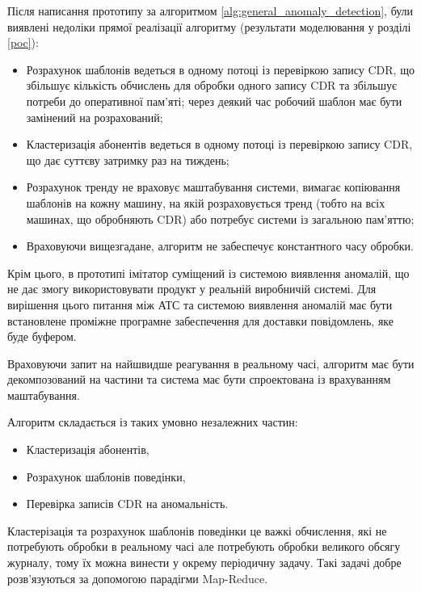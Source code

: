 \label{parallel}
Після написання прототипу за алгоритмом \ref{alg:general_anomaly_detection}, були виявлені недоліки прямої реалізації алгоритму (результати моделювання у розділі \ref{poc}):
\begin{itemize}
\item Розрахунок шаблонів ведеться в одному потоці із перевіркою запису CDR, що збільшує кількість обчислень для обробки одного запису CDR та збільшує потреби до оперативної пам'яті; через деякий час робочий шаблон має бути замінений на розрахований;
\item Кластеризація абонентів ведеться в одному потоці із перевіркою запису CDR, що дає суттєву затримку раз на тиждень;
\item Розрахунок тренду не враховує маштабування системи, вимагає копіювання шаблонів на кожну машину, на якій розраховується тренд (тобто на всіх машинах, що обробняють CDR) або потребує системи із загальною пам'яттю;
\item Враховуючи вищезгадане, алгоритм не забеспечує константного часу обробки.
\end{itemize}

Крім цього, в прототипі імітатор суміщений із системою виявлення аномалій, що не дає змогу використовувати продукт у реальній виробничій системі. Для вирішення цього питання між АТС та системою виявлення аномалій має бути встановлене проміжне програмне забеспечення для доставки повідомлень, яке буде буфером.

Враховуючи запит на найшвидше реагування в реальному часі, алгоритм має бути декомпозований на частини та система має бути спроектована із врахуванням маштабування.

Алгоритм складається із таких умовно незалежних частин: \label{parts_of_algorithm}

\begin{itemize}
\item Кластеризація абонентів,
\item Розрахунок шаблонів поведінки,
\item Перевірка записів CDR на аномальність.
\end{itemize}

Кластерізація та розрахунок шаблонів поведінки це важкі обчислення, які не потребують обробки в реальному часі але потребують обробки великого обсягу журналу, тому їх можна винести у окрему періодичну задачу. Такі задачі добре розв'язуються за допомогою парадігми Map-Reduce.

